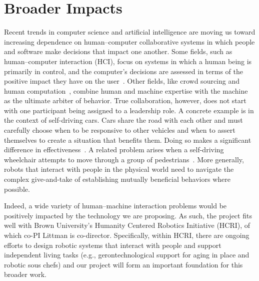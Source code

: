 
\section{Broader Impacts}

Recent trends in computer science and artificial intelligence are
moving us toward increasing dependence on human--computer
collaborative systems in which people and software make decisions that
impact one another.  Some fields, such as human--computer interaction
(HCI), focus on systems in which a human being is primarily in
control, and the computer's decisions are assessed in terms of the
positive impact they have on the user~\cite{maes1993learning}.
Other
fields, like crowd sourcing and human computation~\cite{von2009human},
combine human and machine expertise with the machine as the
ultimate arbiter of behavior.
True collaboration, however, does not start with one participant being
assigned to a leadership role.  
A concrete example
is in the context of self-driving cars.  Cars share the road with each
other and must carefully choose when to be responsive to other
vehicles and when to assert themselves to create a situation that
benefits them.  Doing so makes a significant difference in
effectiveness~\cite{cunningham2015mpdm}.  A related problem
arises when a self-driving wheelchair attempts to move through a group
of pedestrians~\cite{kim2016socially}.  More generally, robots that
interact with people in the physical world need to navigate the
complex give-and-take of establishing mutually beneficial behaviors
where possible.

Indeed, a wide variety of human--machine interaction problems would be
positively impacted by the technology we are proposing.
%
As such, the project fits well with Brown University's Humanity
Centered Robotics Initiative (HCRI), of which co-PI Littman is
co-director.  Specifically, within HCRI, there are ongoing efforts to
design robotic systems that interact with people and support
independent living tasks (e.g., gerontechnological support for aging
in place and robotic sous chefs) and our project will form an
important foundation for this broader work.

